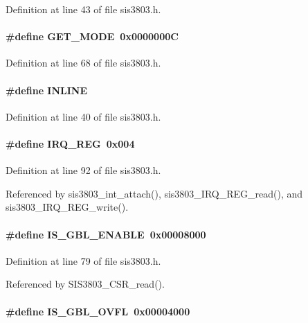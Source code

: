 Definition at line 43 of file sis3803.h.
\paragraph[{GET\_\-MODE}]{\setlength{\rightskip}{0pt plus 5cm}\#define GET\_\-MODE~0x0000000C}\hfill\label{sis3803_8h_a88b365739b031effedb7c30b2c7a7ef2}


Definition at line 68 of file sis3803.h.
\paragraph[{INLINE}]{\setlength{\rightskip}{0pt plus 5cm}\#define INLINE}\hfill\label{sis3803_8h_a2eb6f9e0395b47b8d5e3eeae4fe0c116}


Definition at line 40 of file sis3803.h.
\paragraph[{IRQ\_\-REG}]{\setlength{\rightskip}{0pt plus 5cm}\#define IRQ\_\-REG~0x004}\hfill\label{sis3803_8h_a3cfd1b5386169c0e5bba652f4521bb7d}


Definition at line 92 of file sis3803.h.

Referenced by sis3803\_\-int\_\-attach(), sis3803\_\-IRQ\_\-REG\_\-read(), and sis3803\_\-IRQ\_\-REG\_\-write().
\paragraph[{IS\_\-GBL\_\-ENABLE}]{\setlength{\rightskip}{0pt plus 5cm}\#define IS\_\-GBL\_\-ENABLE~0x00008000}\hfill\label{sis3803_8h_a0a6583b196fe41840a07e8168b88bdbb}


Definition at line 79 of file sis3803.h.

Referenced by SIS3803\_\-CSR\_\-read().
\paragraph[{IS\_\-GBL\_\-OVFL}]{\setlength{\rightskip}{0pt plus 5cm}\#define IS\_\-GBL\_\-OVFL~0x00004000}\hfill\label{sis3803_8h_a060c2dc7a5bc042ee2a29be51094fb96}


